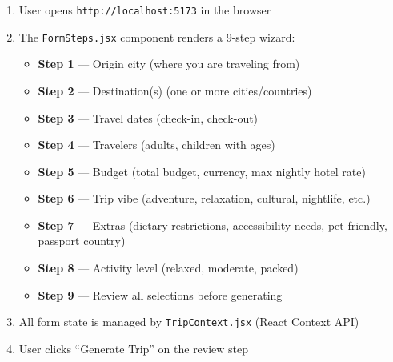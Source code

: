 \documentclass[11pt,a4paper]{article}
\begin{document}
\begin{infobox}
\begin{enumerate}[nosep]
\item User opens \texttt{http://localhost:5173} in the browser
\item The \texttt{FormSteps.jsx} component renders a 9-step wizard:
    \begin{itemize}[nosep]
    \item \textbf{Step 1} --- Origin city (where you are traveling from)
    \item \textbf{Step 2} --- Destination(s) (one or more cities/countries)
    \item \textbf{Step 3} --- Travel dates (check-in, check-out)
    \item \textbf{Step 4} --- Travelers (adults, children with ages)
    \item \textbf{Step 5} --- Budget (total budget, currency, max nightly hotel rate)
    \item \textbf{Step 6} --- Trip vibe (adventure, relaxation, cultural, nightlife, etc.)
    \item \textbf{Step 7} --- Extras (dietary restrictions, accessibility needs, pet-friendly, passport country)
    \item \textbf{Step 8} --- Activity level (relaxed, moderate, packed)
    \item \textbf{Step 9} --- Review all selections before generating
    \end{itemize}
\item All form state is managed by \texttt{TripContext.jsx} (React Context API)
\item User clicks ``Generate Trip'' on the review step
\end{enumerate}
\end{infobox}
\end{document}
